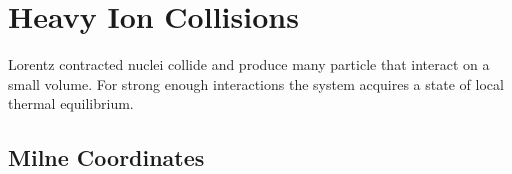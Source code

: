 
\section{Heavy Ion Collisions}

Lorentz contracted nuclei collide and produce many particle that interact on a small volume. For strong enough interactions the system acquires a state of local thermal equilibrium. 

\subsection{Milne Coordinates \cite{JaiswalKoch_2015}}

